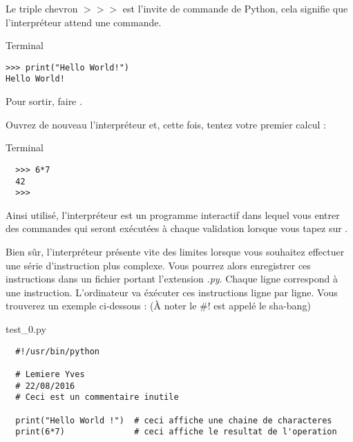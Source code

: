 Le triple chevron $>>>$ est l'invite de commande de Python, cela signifie que l'interpr\'eteur attend une commande.

\vskip 2pt
\begin{center}
  \begin{myterminalbox}[colback=gray!10]{Terminal}
\begin{verbatim}
>>> print("Hello World!")
Hello World!
\end{verbatim}
  \end{myterminalbox}
\end{center}



Pour sortir, faire .


Ouvrez de nouveau l'interpr\'eteur et, cette fois, tentez votre premier calcul :
\vskip 2pt
\begin{center}
    \begin{myterminalbox}[colback=gray!10]{Terminal}
\begin{verbatim}
  >>> 6*7
  42
  >>>
\end{verbatim}

    \end{myterminalbox}
\end{center}


Ainsi utilis\'e, l'interpr\'eteur est un programme interactif dans lequel vous entrer des commandes qui seront ex\'ecut\'ees
\`a chaque validation lorsque vous tapez sur .

Bien s\^ur, l'interpr\'eteur pr\'esente vite des limites lorsque vous souhaitez effectuer une s\'erie d'instruction plus complexe.
Vous pourrez alors enregistrer ces instructions dans un fichier portant l'extension \textit{.py}.
Chaque ligne correspond \`a une instruction. L'ordinateur va \'ex\'ecuter ces instructions ligne par ligne.
Vous trouverez un exemple ci-dessous : (\`A noter le \#! est appel\'e le sha-bang)

\vskip 2pt
\begin{center}
  \begin{myterminalbox}[colback=gray!10]{test\_0.py}
\begin{verbatim}
  #!/usr/bin/python

  # Lemiere Yves
  # 22/08/2016
  # Ceci est un commentaire inutile

  print("Hello World !")  # ceci affiche une chaine de characteres
  print(6*7)              # ceci affiche le resultat de l'operation
\end{verbatim}

  \end{myterminalbox}
\end{center}

